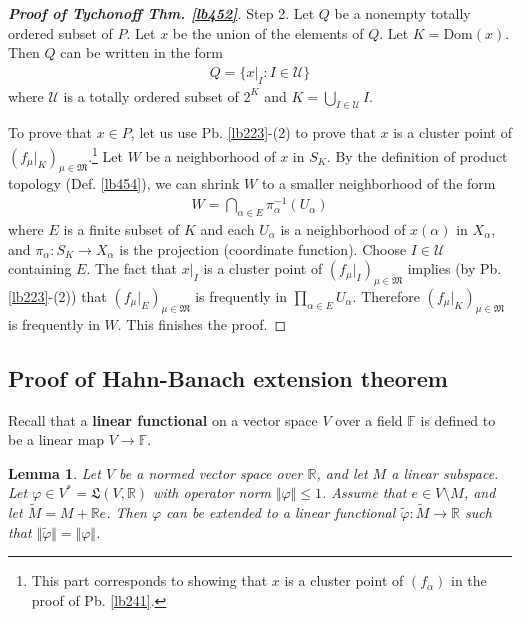 \documentclass[12pt,b5paper,notitlepage]{article}
\theoremstyle{definition}
\theoremstyle{plain}
\newtheorem{lm}[df]{Lemma}
\newcommand{\fk}{\mathfrak}
\newcommand{\wtd}{\widetilde}
\newcommand{\Dom}{\mathrm{Dom}}
\newcommand{\scr}{\mathscr}
\newcommand{\Rbb}{\mathbb R}
\newcommand{\Fbb}{\mathbb F}
\numberwithin{equation}{section}
\begin{document}
\begin{proof}[\textbf{Proof of Tychonoff Thm. \ref{lb452}}]
Step 2. Let $Q$ be a nonempty totally ordered subset of $P$. Let $x$ be the union of the elements of $Q$. Let $K=\Dom(x)$. Then $Q$ can be written in the form
\begin{align*}
Q=\{x|_I:I\in\scr U\}
\end{align*}
where $\scr U$ is a totally ordered subset of $2^K$ and $K=\bigcup_{I\in\scr U}I$.



To prove that $x\in P$,  let us use Pb. \ref{lb223}-(2) to prove that $x$ is a cluster point of $(f_\mu|_K)_{\mu\in\fk M}$.\footnote{This part corresponds to showing that $x$ is a cluster point of $(f_\alpha)$ in the proof of Pb. \ref{lb241}.} Let $W$ be a neighborhood of $x$ in $S_K$. By the definition of product topology (Def. \ref{lb454}), we can shrink $W$ to a smaller neighborhood of the form
\begin{align*}
W=\bigcap_{\alpha\in E}\pi_\alpha^{-1}(U_\alpha)
\end{align*}
where $E$ is a finite subset of $K$ and each $U_\alpha$ is a neighborhood of $x(\alpha)$ in $X_\alpha$, and $\pi_\alpha:S_K\rightarrow X_\alpha$ is the projection (coordinate function). Choose $I\in\scr U$ containing $E$. The fact that $x|_I$ is a cluster point of $(f_\mu|_I)_{\mu\in\fk M}$ implies (by Pb. \ref{lb223}-(2)) that $(f_\mu|_E)_{\mu\in\fk M}$ is frequently in $\prod_{\alpha\in E}U_\alpha$. Therefore $(f_\mu|_K)_{\mu\in\fk M}$ is frequently in $W$. This finishes the proof.
\end{proof}




\subsection{Proof of Hahn-Banach extension theorem}

Recall that a \textbf{linear functional} on a vector space $V$ over a field $\Fbb$ is defined to be a linear map $V\rightarrow\Fbb$.

\begin{lm}\label{lb498}
Let $V$ be a normed vector space over $\Rbb$, and let $M$ a linear subspace. Let $\varphi\in V^*=\fk L(V,\Rbb)$ with operator norm $\Vert\varphi\Vert\leq 1$. Assume that $e\in V\setminus M$, and let $\wtd M=M+\Rbb e$. Then $\varphi$ can be extended to a linear functional $\wtd\varphi:\wtd M\rightarrow\Rbb$ such that $\Vert\wtd \varphi\Vert=\Vert\varphi\Vert$. 
\end{lm}
\end{document}
